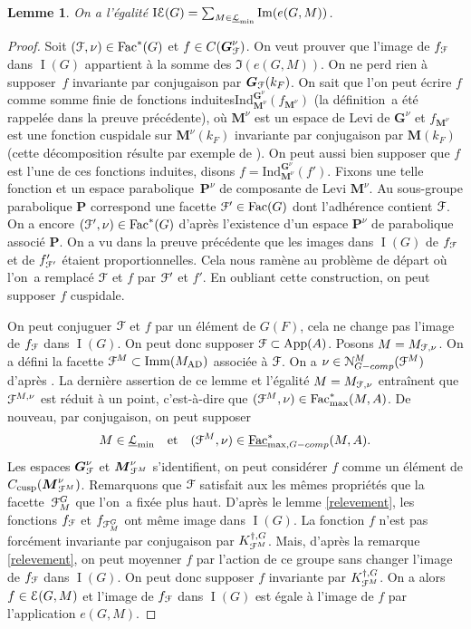 \documentclass[11pt]{article}
\numberwithin{equation}{section}\providecommand{\og}{«\,}\providecommand{\fg}{\,»}
\let\mathcal \EuScript
\newcommand{\quadet}{\quad\text{et}\quad}
\newcommand{\AD}{\mathrm{AD}}
\newcommand{\App}{\mathrm{App}}
\newcommand{\tcomp}{\textup{-comp}}
\newcommand{\cusp}{\mathrm{cusp}}
\newcommand{\Fac}{\mathrm{Fac}}
\newcommand{\Imm}{\mathrm{Imm}}
\newcommand{\Ind}{\mathrm{Ind}}
\DeclareMathOperator{\rI}{I}
\DeclareMathOperator{\rIE}{I\cE}
\newcommand{\bG}{\boldsymbol{G}}
\newcommand{\bM}{\boldsymbol{M}}
\newcommand{\bP}{\boldsymbol{P}}
\newcommand{\cE}{\mathcal{E}}
\newcommand{\cF}{\mathcal{F}}
\newcommand{\cL}{\mathcal{L}}
\newcommand{\cN}{\mathcal{N}}
\theoremstyle{plain}
\newtheorem*{lem*}{Lemme}
\theoremstyle{definition}
\begin{document}
\begin{lem*}
On a l'égalité $\rIE(G)=\sum_{M\in \underline{\cL}_{\min}}\Im(e(G,M))$.
\end{lem*}

\begin{proof}
Soit $(\cF,\nu)\in \Fac^*(G)$ et $f\in C(\bG_{\cF}^{\nu})$. On veut prouver que l'image de $f_{\cF}$ dans $\rI(G)$ appartient à la somme des $\Im(e(G,M))$. On ne perd rien à supposer~$f$ invariante par conjugaison par $\bG_{\cF}(k_{F})$. On sait que l'on peut écrire $f$ comme somme finie de fonctions \og induites\fg $\Ind_{\bM^{\nu}}^{\bG^{\nu}}(f_{\bM^{\nu}})$ (la définition~a été rappelée dans la preuve précédente), où $\bM^{\nu}$ est un espace de Levi de $\bG^{\nu}$ et $f_{\bM^{\nu}}$ est une fonction cuspidale sur $\bM^{\nu}(k_{F})$ invariante par conjugaison par $\bM(k_{F})$ (cette décomposition résulte par exemple de \cite[Th.\,2.11]{A}). On peut aussi bien supposer que $f$ est l'une de ces fonctions induites, disons $f=\Ind_{\bM^{\nu}}^{\bG^{\nu}}(f')$. Fixons une telle fonction et un espace parabolique~$\bP^{\nu}$ de composante de Levi $\bM^{\nu}$. Au sous-groupe parabolique $\bP$ correspond une facette $\cF'\in \Fac(G)$ dont l'adhérence contient $\cF$. On a encore $(\cF',\nu)\in \Fac^*(G)$ d'après l'existence d'un espace $\bP^{\nu}$ de parabolique associé $\bP$. On a vu dans la preuve précédente que les images dans $\rI(G)$ de $f_{\cF}$ et de $f'_{\cF'}$ étaient proportionnelles.
Cela nous ramène au problème de départ où l'on~a remplacé $\cF$ et $f$ par $\cF'$ et $f'$. En oubliant cette construction, on peut supposer $f$ cuspidale.

On peut conjuguer $\cF$ et $f$ par un élément de $G(F)$, cela ne change pas l'image de $f_{\cF}$ dans $\rI(G)$. On peut donc supposer $\cF\subset \App(A)$. Posons $M=M_{\cF,\nu}$. On a défini la facette $\cF^M\subset \Imm(M_{\AD})$ associée à $\cF$. On a $\nu\in \cN_{G\tcomp}^M(\cF^M)$ d'après \cite[Lem.\,6(i)]{W2}. La dernière assertion de ce lemme et l'égalité $M=M_{\cF,\nu}$ entraînent que $\cF^{M,\nu}$ est réduit à un point, c'est-à-dire que $(\cF^M,\nu)\in \Fac^*_{\max}(M,A)$. De nouveau, par conjugaison, on peut supposer
\[
M\in \underline{\cL}_{\min}\quadet (\cF^M,\nu)\in \underline{\Fac}^*_{\max,G\tcomp}(M,A).
\]
Les espaces $\bG_{\cF}^{\nu}$ et $\bM_{\cF^M}^{\nu}$ s'identifient, on peut considérer $f$ comme un élément de $C_{\cusp}(\bM_{\cF^M}^{\nu})$. Remarquons que $\cF$ satisfait aux les mêmes propriétés que la facette~$\cF_{M}^G$ que l'on~a fixée plus haut. D'après le lemme \ref{relevement}, les fonctions $f_{\cF}$ et $f_{\cF_{M}^G}$ ont même image dans $\rI(G)$. La fonction $f$ n'est pas forcément invariante par
conjugaison par $K_{\cF^M}^{\dag,G}$. Mais, d'après la remarque \ref{relevement}, on peut moyenner $f$ par l'action de ce groupe sans changer l'image de $f_{\cF}$ dans $\rI(G)$. On peut donc supposer $f$ invariante par $K_{\cF^M}^{\dag,G}$. On a alors $f\in \cE(G,M)$ et l'image de $f_{\cF}$ dans $\rI(G)$ est égale à l'image de $f$ par l'application $e(G,M)$.
\end{proof}
\end{document}
